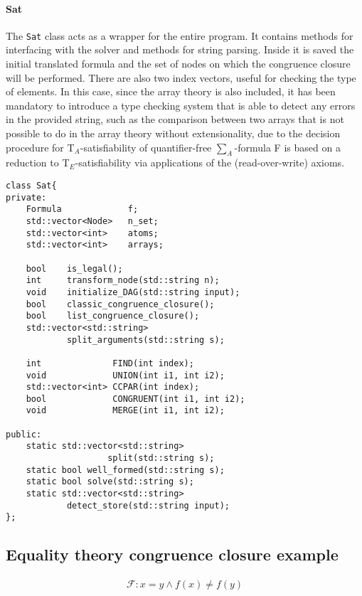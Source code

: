 \documentclass{IEEEtran}
\begin{document}
\paragraph{Sat}
The \verb|Sat| class acts as a wrapper for the entire program. It contains methods for interfacing with the solver and methods for string parsing. Inside it is saved the initial translated formula and the set of nodes on which the congruence closure will be performed. There are also two index vectors, useful for checking the type of elements. In this case, since the array theory is also included, it has been mandatory to introduce a type checking system that is able to detect any errors in the provided string, such as the comparison between two arrays that is not possible to do in the array theory without extensionality, due to the decision procedure for T$_A$-satisfiability of quantifier-free $\sum_A$-formula F is based on a reduction to T$_E$-satisfiability via applications of the (read-over-write) axioms. 

\begin{lstlisting}[style=cpp]
class Sat{
private:
	Formula 			f;
	std::vector<Node> 	n_set;
	std::vector<int> 	atoms;
	std::vector<int> 	arrays;

	bool	is_legal();
	int 	transform_node(std::string n);
	void 	initialize_DAG(std::string input);
	bool 	classic_congruence_closure();
	bool 	list_congruence_closure();
	std::vector<std::string> 
			split_arguments(std::string s);

	int 			 FIND(int index);
	void 			 UNION(int i1, int i2);
	std::vector<int> CCPAR(int index);
	bool 			 CONGRUENT(int i1, int i2);
	void 			 MERGE(int i1, int i2);

public:
	static std::vector<std::string> 
					split(std::string s);
	static bool well_formed(std::string s);
	static bool solve(std::string s);
	static std::vector<std::string> 
			detect_store(std::string input);
};
\end{lstlisting}

















\subsection{Equality theory congruence closure example}
\begin{align*}
	\mathcal{F} : x = y \land f(x) \ne f(y)
\end{align*}
\end{document}
